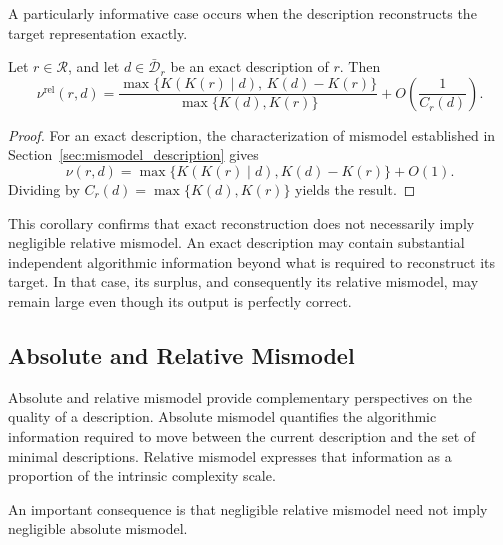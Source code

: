 A particularly informative case occurs when the description reconstructs the target representation exactly.

\begin{corollary}
\label{cor:relative_mismodel_exact_description}
Let $r\in\mathcal R$, and let $d\in\bar{\mathcal D}_r$ be an exact description of $r$. Then
\[
\nu^{\mathrm{rel}}(r,d) = \frac{ \max\{K(K(r)\mid d),\,K(d)-K(r)\} }{ \max\{K(d),K(r)\} }
+ O\left(\frac{1}{C_r(d)}\right).
\]
\end{corollary}
\begin{proof}
For an exact description, the characterization of mismodel established in Section~\ref{sec:mismodel_description} gives
\[
\nu(r,d) = \max\{K(K(r)\mid d),K(d)-K(r)\}+O(1).
\]
Dividing by $C_r(d)=\max\{K(d),K(r)\}$ yields the result.
\end{proof}

This corollary confirms that exact reconstruction does not necessarily imply negligible relative mismodel. An exact description may contain substantial independent algorithmic information beyond what is required to reconstruct its target. In that case, its surplus, and consequently its relative mismodel, may remain large even though its output is perfectly correct.


\subsection*{Absolute and Relative Mismodel}

Absolute and relative mismodel provide complementary perspectives on the quality of a description. Absolute mismodel quantifies the algorithmic information required to move between the current description and the set of minimal descriptions. Relative mismodel expresses that information as a proportion of the intrinsic complexity scale.

An important consequence is that negligible relative mismodel need not imply negligible absolute mismodel.

